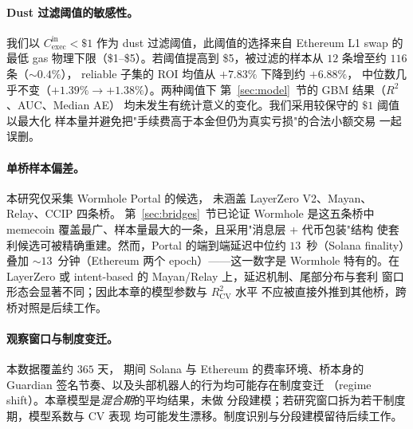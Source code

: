 \documentclass[sigconf,nonacm,10pt]{acmart}
\newcommand{\Cexec}{C_{\text{exec}}}
\begin{document}
\paragraph{Dust 过滤阈值的敏感性。} 我们以
$\Cexec^{\text{in}}<\$1$ 作为 dust 过滤阈值，此阈值的选择来自
Ethereum L1 swap 的最低 gas 物理下限（\$1--\$5）。若阈值提高到
\$5，被过滤的样本从 $12$ 条增至约 $116$ 条（$\sim0.4\%$），
reliable 子集的 ROI 均值从 $+7.83\%$ 下降到约 $+6.88\%$，
中位数几乎不变（$+1.39\%\to+1.38\%$）。两种阈值下
第~\ref{sec:model}~节的 GBM 结果（$R^2$、AUC、Median AE）
均未发生有统计意义的变化。我们采用较保守的 $\$1$ 阈值以最大化
样本量并避免把"手续费高于本金但仍为真实亏损"的合法小额交易
一起误删。

\paragraph{单桥样本偏差。} 本研究仅采集 Wormhole Portal 的候选，
未涵盖 LayerZero V2、Mayan、Relay、CCIP 四条桥。
第~\ref{sec:bridges}~节已论证 Wormhole 是这五条桥中 memecoin
覆盖最广、样本量最大的一条，且采用"消息层 + 代币包装"结构
使套利候选可被精确重建。然而，Portal 的端到端延迟中位约
$13$~秒（Solana finality）叠加 $\sim13$~分钟（Ethereum 两个
epoch）——这一数字是 Wormhole 特有的。在 LayerZero 或
intent-based 的 Mayan/Relay 上，延迟机制、尾部分布与套利
窗口形态会显著不同；因此本章的模型参数与 $R^2_{\text{CV}}$ 水平
不应被直接外推到其他桥，跨桥对照是后续工作。

\paragraph{观察窗口与制度变迁。} 本数据覆盖约 $365$ 天，
期间 Solana 与 Ethereum 的费率环境、桥本身的 Guardian
签名节奏、以及头部机器人的行为均可能存在制度变迁
（regime shift）。本章模型是\emph{混合期}的平均结果，未做
分段建模；若研究窗口拆为若干制度期，模型系数与 CV 表现
均可能发生漂移。制度识别与分段建模留待后续工作。
\end{document}
